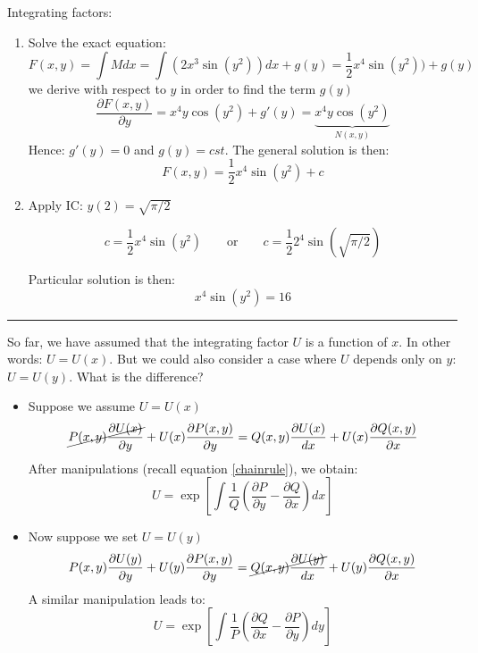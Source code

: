 \begin{exmp}{Integrating factors:}
\begin{enumerate}
\item Solve the exact equation:
\begin{equation*}
F(x,y)=\int M dx=  \int (2{x}^3\sin(y^2)) dx+ g(y) =  \frac{1}{2}{x}^4\sin(y^2)) +g(y)
\end{equation*}
we derive with respect to $y$ in order to find the term $g(y)$
\begin{equation*}
\frac{\partial F(x,y)}{\partial y}= {x}^4y\cos(y^2) +g'(y) = \underbrace{{x}^4y\cos(y^2)}_{N(x,y)}
\end{equation*}
Hence:  $g'(y)=0$ and $g(y)=cst$.
The general solution is then:
\begin{equation*}
F(x,y)= \frac{1}{2}{x}^4\sin(y^2) +c
\end{equation*}
\item Apply IC: $y(2)=\sqrt{\pi/2}$

\begin{equation*}
c= \frac{1}{2}{x}^4\sin(y^2) \qquad \text{or}\qquad c= \frac{1}{2}{2}^4\sin(\sqrt{\pi/2})
\end{equation*}

Particular solution is then:
\begin{equation*}
\boxed{{x}^4\sin(y^2) =16}
\end{equation*}
\end{enumerate}
\end{exmp}

\begin{center}
\noindent\rule{4cm}{0.4pt}
\end{center}


So far, we have assumed that the integrating factor $U$ is a function of $x$. In other words: $U=U(x)$. But we could also consider a case where $U$ depends only on $y$: $U=U(y)$. What is the difference?
\begin{itemize}
\item Suppose we assume $U=U(x)$ 
\begin{equation*}
\cancel{P(x,y)\frac{\partial U(x)}{\partial y}}+U(x)\frac{\partial P(x,y)}{\partial y}={Q(x,y)\frac{\partial U(x)}{dx}}+U(x)\frac{\partial Q(x,y)}{\partial x}
\end{equation*}
After manipulations (recall equation \eqref{chainrule}), we obtain:
\begin{equation*}
\boxed{U=\exp\left[\int \frac{1}{Q}\left(\frac{\partial P}{\partial y}-\frac{\partial Q}{\partial x}\right)  dx\right]}
\end{equation*}

\item Now suppose we set $U=U(y)$
\begin{equation*}
P(x,y)\frac{\partial U(y)}{\partial y}+U(y)\frac{\partial P(x,y)}{\partial y}=\cancel{Q(x,y)\frac{\partial U(y)}{dx}}+U(y)\frac{\partial Q(x,y)}{\partial x}
\end{equation*}
A similar manipulation leads to:
\begin{equation*}
\boxed{U=\exp\left[\int \frac{1}{P}\left(\frac{\partial Q}{\partial x}-\frac{\partial P}{\partial y}\right) dy\right]}
\end{equation*}
\end{itemize}


